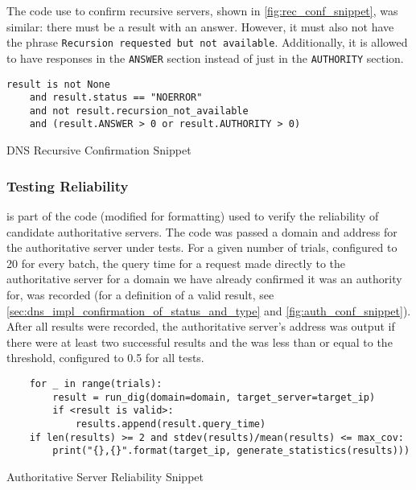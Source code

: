 The code use to confirm recursive servers, shown in \cref{fig:rec_conf_snippet}, was similar: there must be a result with an answer. However, it must also not have the phrase \texttt{Recursion requested but not available}. Additionally, it is allowed to have responses in the \texttt{ANSWER} section instead of just in the \texttt{AUTHORITY} section.

\begin{code}[H]
\centering
    \begin{verbatim}
result is not None 
    and result.status == "NOERROR" 
    and not result.recursion_not_available 
    and (result.ANSWER > 0 or result.AUTHORITY > 0)
    \end{verbatim}
    \caption{DNS Recursive Confirmation Snippet}
    \label{fig:rec_conf_snippet}
\end{code}

\subsubsection{Testing Reliability}

 is part of the code (modified for formatting) used to verify the reliability of candidate authoritative servers. The code was passed a domain and \ip address for the authoritative server under tests. For a given number of trials, configured to 20 for every batch, the query time for a request made directly to the authoritative server for a domain we have already confirmed it was an authority for, was recorded (for a definition of a valid result, see \cref{sec:dns_impl_confirmation_of_status_and_type} and \cref{fig:auth_conf_snippet}). After all results were recorded, the authoritative server's \ip address was output if there were at least two successful results and the \cv was less than or equal to the threshold, configured to 0.5 for all tests.

\begin{code}[h]
\centering
    \begin{verbatim}
    for _ in range(trials):
        result = run_dig(domain=domain, target_server=target_ip)
        if <result is valid>:
            results.append(result.query_time)
    if len(results) >= 2 and stdev(results)/mean(results) <= max_cov:
        print("{},{}".format(target_ip, generate_statistics(results)))
    \end{verbatim}
    \caption{Authoritative Server Reliability Snippet}
    \label{fig:auth_reliability_snippet}
\end{code}

